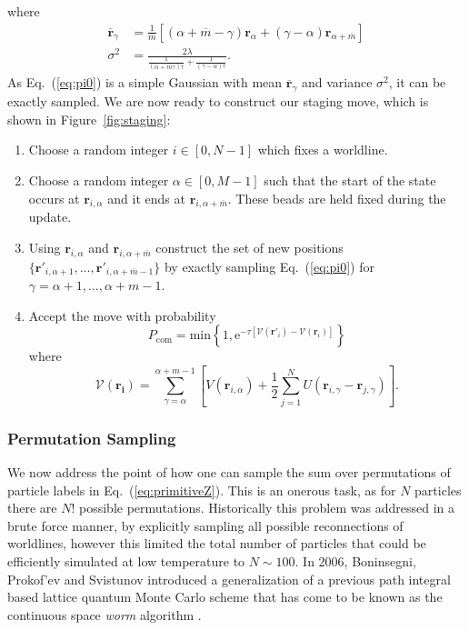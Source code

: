 \documentclass[prb,aps,amssym,nofootinbib,floatfix,notitlepage]{revtex4-1}
\renewcommand{\vec}[1]{\boldsymbol{#1}}
\newcommand{\e}[1]{\mathrm{e}^{#1}}
\renewcommand{\eqref}[1]{Eq.~(\ref{#1})}
\begin{document}
%
where 
%
\begin{align}
    \overline{\vec{r}}_\gamma &= \frac{1}{\overline{m}}
    \left[(\alpha+\overline{m}-\gamma)\vec{r}_{\alpha} +
    (\gamma-\alpha)\vec{r}_{\alpha+\overline{m}}\right] \nonumber \\
    \sigma^2 &= \frac{2\lambda}{\frac{1}{(\alpha + \overline{m}\gamma)\tau} +
\frac{1}{(\gamma-\alpha)\tau}}.
\end{align}
%
As \eqref{eq:pi0} is a simple Gaussian with mean $\overline{\vec{r}}_\gamma$ and
variance $\sigma^2$, it can be exactly sampled.  We are now ready to construct
our staging move, which is shown in Figure~\ref{fig:staging}:
\begin{enumerate}
    \item Choose a random integer $i \in [0,N-1]$ which fixes a worldline.
    \item Choose a random integer $\alpha \in [0,M-1]$ such that the start of
        the state occurs at $\vec{r}_{i,\alpha}$ and it ends at
        $\vec{r}_{i,\alpha+\overline{m}}$.  These beads are held fixed during
    the update.  \item Using $\vec{r}_{i,\alpha}$ and
        $\vec{r}_{i,\alpha+\overline{m}}$ construct the set of new positions
        $\{\vec{r}'_{i,\alpha+1},\ldots,\vec{r}'_{i,\alpha+\overline{m}-1}\}$ by exactly
        sampling \eqref{eq:pi0} for $\gamma = \alpha+1,\ldots,\alpha+m-1$.
    \item Accept the move with probability
\begin{equation}
    P_{\text{com}} = \mathrm{min} 
    \left\{1,\e{-\tau[\mathcal{V}(\vec{r}'_i)-\mathcal{V}(\vec{r}_i)]} \right\}
\end{equation}
%
where 
%
\begin{equation}
    \mathcal{V}(\vec{r_i}) = \sum_{\gamma=\alpha}^{\alpha+m-1}\left[ V(\vec{r}_{i,\alpha}) + \frac{1}{2}\sum_{j=1}^{N}
    U(\vec{r}_{i,\gamma}-\vec{r}_{j,\gamma})\right].
\end{equation}
%
\end{enumerate}

\subsubsection{Permutation Sampling}
We now address the point of how one can sample the sum over permutations of
particle labels in \eqref{eq:primitiveZ}. This is an onerous task, as for $N$
particles there are $N!$ possible permutations.  Historically this problem was
addressed in a brute force manner, by explicitly sampling all possible
reconnections of worldlines, however this limited the total number of
particles that could be efficiently simulated at low temperature to $N \sim
100$. In 2006, Boninsegni, Prokof'ev and Svistunov introduced a generalization
of a previous path integral based lattice quantum Monte Carlo scheme
\cite{Prokofev:1998ux} that has come to be known as the continuous space
\emph{worm} algorithm \cite{Boninsegni:2006ed,Boninsegni:2006gc}.
\end{document}
